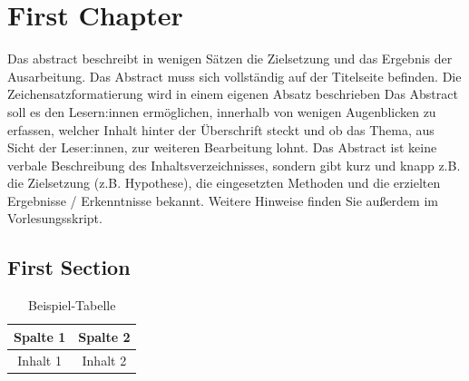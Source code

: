 

\chapter{First Chapter}

Das \gls{abstract} beschreibt in wenigen Sätzen die Zielsetzung und das Ergebnis der Ausarbeitung. Das Abstract muss sich vollständig auf der Titelseite befinden. Die Zeichensatzformatierung wird in einem eigenen Absatz beschrieben  Das Abstract soll es den Lesern:innen ermöglichen, innerhalb von wenigen Augenblicken zu erfassen, welcher Inhalt hinter der Überschrift steckt und ob das Thema, aus Sicht der Leser:innen, zur weiteren Bearbeitung lohnt. Das Abstract ist keine verbale Beschreibung des Inhaltsverzeichnisses, sondern gibt kurz und knapp z.B. die Zielsetzung (z.B. Hypothese), die eingesetzten Methoden und die erzielten Ergebnisse / Erkenntnisse bekannt. Weitere Hinweise finden Sie außerdem im Vorlesungsskript.

\section{First Section}

\begin{table}[h]
\centering
\begin{tabular}{|c|c|}
\hline
Spalte 1 & Spalte 2 \\
\hline
Inhalt 1 & Inhalt 2 \\
\hline
\end{tabular}
\caption{Beispiel-Tabelle}
\label{tab:example}
\end{table}

